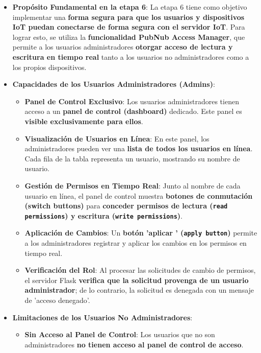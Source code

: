 \documentclass{report}
\begin{document}
\begin{itemize}
    \item \textbf{Propósito Fundamental en la etapa 6}: La etapa 6 tiene como objetivo implementar una \textbf{forma segura para que los usuarios y 
    dispositivos IoT puedan conectarse de forma segura con el servidor IoT}. Para lograr esto, se utiliza la \textbf{funcionalidad PubNub Access Manager}, 
    que permite a los usuarios administradores \textbf{otorgar acceso de lectura y escritura en tiempo real} tanto a los usuarios no administradores como 
    a los propios dispositivos.
    \item \textbf{Capacidades de los Usuarios Administradores (Admins)}:
    \begin{itemize}
        \item \textbf{Panel de Control Exclusivo}: Los usuarios administradores tienen acceso a un \textbf{panel de control (dashboard)} dedicado. 
        Este panel es \textbf{visible exclusivamente para ellos}.
        \item \textbf{Visualización de Usuarios en Línea}: En este panel, los administradores pueden ver una \textbf{lista de todos los usuarios en línea}. 
        Cada fila de la tabla representa un usuario, mostrando su nombre de usuario.
        \item \textbf{Gestión de Permisos en Tiempo Real}: Junto al nombre de cada usuario en línea, el panel de control muestra \textbf{botones de conmutación 
        (switch buttons)} para \textbf{conceder permisos de lectura (\texttt{read permissions}) y escritura (\texttt{write permissions})}.
        \item \textbf{Aplicación de Cambios}: Un \textbf{botón  'aplicar ' (\texttt{apply button})} permite a los administradores registrar y aplicar los 
        cambios en los permisos en tiempo real.
        \item \textbf{Verificación del Rol}: Al procesar las solicitudes de cambio de permisos, el servidor Flask \textbf{verifica que la solicitud provenga 
        de un usuario administrador}; de lo contrario, la solicitud es denegada con un mensaje de  'acceso denegado'.
    \end{itemize}
    \item \textbf{Limitaciones de los Usuarios No Administradores}:
    \begin{itemize}
        \item \textbf{Sin Acceso al Panel de Control}: Los usuarios que no son administradores \textbf{no tienen acceso al panel de control de acceso}. 

\end{itemize}
\end{itemize}
\end{document}
